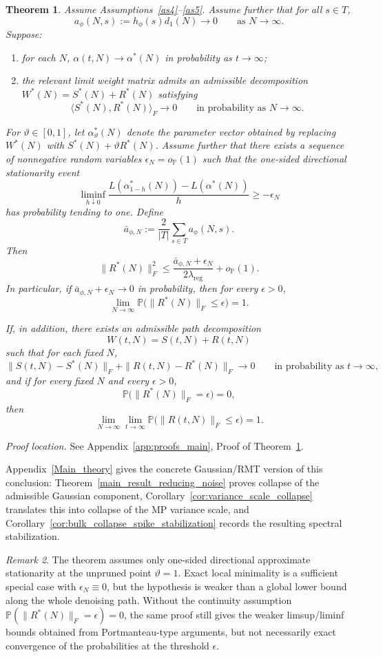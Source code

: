 \documentclass[11pt]{article}
\theoremstyle{plain}
\newtheorem{thm}{Theorem}[section]
\theoremstyle{definition}
\theoremstyle{remark}
\newtheorem{rem}[thm]{Remark}
\newcommand{\PP}{\mathbb{P}}
\newcommand{\1}{\mathbf{1}}
\newcommand{\proofloc}[1]{\par\noindent\emph{Proof location.} #1\par}
\begin{document}
\begin{thm}
\label{main_result_reducing_noise_general}
Assume Assumptions~\ref{as4}--\ref{as5}. Assume further that for all \(s\in T\),
\[
a_\phi(N,s):=h_\phi(s)d_1(N)\to0
\qquad\text{as }N\to\infty.
\]
Suppose:
\begin{enumerate}[leftmargin=2em]
\item for each \(N\), \(\alpha(t,N)\to \alpha^*(N)\) in probability as \(t\to\infty\);
\item the relevant limit weight matrix admits an admissible decomposition \(W^*(N)=S^*(N)+R^*(N)\) satisfying
\[
\langle S^*(N),R^*(N)\rangle_F\to0
\qquad\text{in probability as }N\to\infty.
\]
\end{enumerate}
\noindent For \(\vartheta\in[0,1]\), let \(\alpha_\vartheta^*(N)\) denote the parameter vector obtained by replacing \(W^*(N)\) with \(S^*(N)+\vartheta R^*(N)\). Assume further that there exists a sequence of nonnegative random variables \(\epsilon_N=o_{\PP}(1)\) such that the one-sided directional stationarity event
\[
\liminf_{h\downarrow0}
\frac{
L(\alpha_{1-h}^*(N))-L(\alpha^*(N))
}{h}
\ge -\epsilon_N
\]
has probability tending to one.
Define
\[
\bar a_{\phi,N}:=\frac{2}{|T|}\sum_{s\in T}a_\phi(N,s).
\]
Then
\[
\|R^*(N)\|_F^2
\le
\frac{\bar a_{\phi,N}+\epsilon_N}{2\lambda_{\mathrm{reg}}}
+o_{\PP}(1).
\]
In particular, if \(\bar a_{\phi,N}+\epsilon_N\to0\) in probability, then for every \(\epsilon>0\),
\[
\lim_{N\to\infty}\PP\big(\|R^*(N)\|_F\le \epsilon\big)=1.
\]

If, in addition, there exists an admissible path decomposition
\[
W(t,N)=S(t,N)+R(t,N)
\]
such that for each fixed \(N\),
\[
\|S(t,N)-S^*(N)\|_F+\|R(t,N)-R^*(N)\|_F\to0
\qquad\text{in probability as }t\to\infty,
\]
and if for every fixed \(N\) and every \(\epsilon>0\),
\[
\PP\big(\|R^*(N)\|_F=\epsilon\big)=0,
\]
then
\[
\lim_{N\to\infty}\lim_{t\to\infty}\PP\big(\|R(t,N)\|_F\le \epsilon\big)=1.
\]
\end{thm}
\proofloc{See Appendix~\ref{app:proofs_main}, Proof of Theorem~\ref{main_result_reducing_noise_general}.}

Appendix~\ref{Main_theory} gives the concrete Gaussian/RMT version of this conclusion: Theorem~\ref{main_result_reducing_noise} proves collapse of the admissible Gaussian component, Corollary~\ref{cor:variance_scale_collapse} translates this into collapse of the MP variance scale, and Corollary~\ref{cor:bulk_collapse_spike_stabilization} records the resulting spectral stabilization.

\begin{rem}
The theorem assumes only one-sided directional approximate stationarity at the unpruned point \(\vartheta=1\). Exact local minimality is a sufficient special case with \(\epsilon_N\equiv0\), but the hypothesis is weaker than a global lower bound along the whole denoising path. Without the continuity assumption \(\PP(\|R^*(N)\|_F=\epsilon)=0\), the same proof still gives the weaker limsup/liminf bounds obtained from Portmanteau-type arguments, but not necessarily exact convergence of the probabilities at the threshold \(\epsilon\).
\end{rem}
\end{document}
